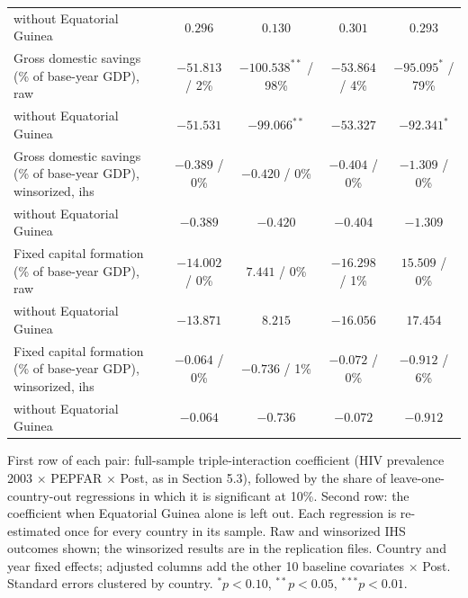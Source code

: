 \begin{table}[htbp]
{\begin{tabular}{lcccc}
\quad without Equatorial Guinea & $0.296$ & $0.130$ & $0.301$ & $0.293$ \\
Gross domestic savings (\% of base-year GDP), raw & $-51.813$ / 2\% & $-100.538^{**}$ / 98\% & $-53.864$ / 4\% & $-95.095^{*}$ / 79\% \\
\quad without Equatorial Guinea & $-51.531$ & $-99.066^{**}$ & $-53.327$ & $-92.341^{*}$ \\
Gross domestic savings (\% of base-year GDP), winsorized, ihs & $-0.389$ / 0\% & $-0.420$ / 0\% & $-0.404$ / 0\% & $-1.309$ / 0\% \\
\quad without Equatorial Guinea & $-0.389$ & $-0.420$ & $-0.404$ & $-1.309$ \\
Fixed capital formation (\% of base-year GDP), raw & $-14.002$ / 0\% & $7.441$ / 0\% & $-16.298$ / 1\% & $15.509$ / 0\% \\
\quad without Equatorial Guinea & $-13.871$ & $8.215$ & $-16.056$ & $17.454$ \\
Fixed capital formation (\% of base-year GDP), winsorized, ihs & $-0.064$ / 0\% & $-0.736$ / 1\% & $-0.072$ / 0\% & $-0.912$ / 6\% \\
\quad without Equatorial Guinea & $-0.064$ & $-0.736$ & $-0.072$ & $-0.912$ \\
\bottomrule
\end{tabular}}
\par\vspace{4pt}
\begin{minipage}{\textwidth}\footnotesize First row of each pair: full-sample triple-interaction coefficient (HIV prevalence 2003 $\times$ PEPFAR $\times$ Post, as in Section 5.3), followed by the share of leave-one-country-out regressions in which it is significant at 10\%. Second row: the coefficient when Equatorial Guinea alone is left out. Each regression is re-estimated once for every country in its sample. Raw and winsorized IHS outcomes shown; the winsorized results are in the replication files. Country and year fixed effects; adjusted columns add the other 10 baseline covariates $\times$ Post. Standard errors clustered by country. $^{*}p<0.10$, $^{**}p<0.05$, $^{***}p<0.01$.\end{minipage}
\end{table}
